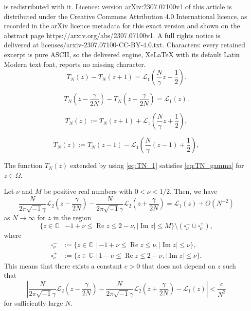 \documentclass[10pt,a4paper]{amsart}
\newcommand{\C}{\mathbb{C}}
\renewcommand{\Im}{\operatorname{Im}}
\renewcommand{\L}{\mathcal{L}}
\renewcommand{\Re}{\operatorname{Re}}
\renewcommand{\i}{\sqrt{-1}}
\begin{document}
is redistributed with it. Licence: version arXiv:2307.07100v1 of this article is distributed under the Creative Commons Attribution 4.0 International licence, as recorded in the arXiv licence metadata for this exact version and shown on the abstract page https://arxiv.org/abs/2307.07100v1. A full rights notice is delivered at licenses/arxiv-2307.07100-CC-BY-4.0.txt. Characters: every retained excerpt is pure ASCII, so the delivered engine, XeLaTeX with its default Latin Modern text font, reports no missing character.
\begin{equation}\label{eq:TN_1}
  T_{N}(z)-T_{N}(z+1)
  =
  \L_1\left(\frac{N}{\gamma}z+\frac{1}{2}\right).
\end{equation}

\begin{equation}\label{eq:TN_gamma}
  T_{N}\left(z-\frac{\gamma}{2N}\right)-T_{N}\left(z+\frac{\gamma}{2N}\right)
  =
  \L_1(z).
\end{equation}

\begin{equation}\label{eq:TN_negative}
  T_{N}(z)
  :=
  T_{N}(z+1)
  +
  \L_1\left(\frac{N}{\gamma}z+\frac{1}{2}\right),
\end{equation}

\begin{equation}\label{eq:TN_positive}
  T_{N}(z)
  :=
  T_{N}(z-1)
  -
  \L_1\left(\frac{N}{\gamma}(z-1)+\frac{1}{2}\right),
\end{equation}

\begin{lem}\label{lem:TN_gamma_Omega}
The function $T_{N}(z)$ extended by using \eqref{eq:TN_1} satisfies \eqref{eq:TN_gamma} for $z\in\Omega$.
\end{lem}

\begin{lem}\label{lem:L2_L1_gamma}
Let $\nu$ and $M$ be positive real numbers with $0<\nu<1/2$.
Then, we have
\begin{equation*}
  \frac{N}{2\pi\i\gamma}\L_2\left(z-\frac{\gamma}{2N}\right)
  -
  \frac{N}{2\pi\i\gamma}\L_2\left(z+\frac{\gamma}{2N}\right)
  =
  \L_1(z)
  +
  O(N^{-2})
\end{equation*}
as $N\to\infty$ for $z$ in the region
\begin{equation}\label{eq:L2_L1_approx}
  \{z\in\C\mid-1+\nu\le\Re{z}\le2-\nu,|\Im{z}|\le M\}
  \setminus\left(\square^{-}_{\nu}\cup\square^{+}_{\nu}\right),
\end{equation}
where
\begin{align*}
  \square^{-}_{\nu}
  &:=
  \{z\in\C\mid-1+\nu\le\Re{z}\le\nu,|\Im{z}|\le\nu\},
  \\
  \square^{+}_{\nu}
  &:=
  \{z\in\C\mid1-\nu\le\Re{z}\le2-\nu,|\Im{z}|\le\nu\}.
\end{align*}
This means that there exists a constant $c>0$ that does not depend on $z$ such that
\begin{equation*}
  \left|
    \frac{N}{2\pi\i\gamma}\L_2\left(z-\frac{\gamma}{2N}\right)
    -
    \frac{N}{2\pi\i\gamma}\L_2\left(z+\frac{\gamma}{2N}\right)
    -
    \L_1(z)
  \right|
  <
  \frac{c}{N^2}
\end{equation*}
for sufficiently large $N$.
\end{lem}
\end{document}
